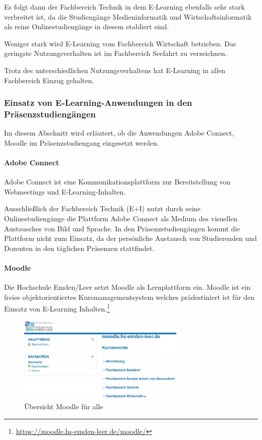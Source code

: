 Es folgt dann der Fachbereich Technik in dem E-Learning ebenfalls sehr stark verbreitet ist, da die Studiengänge Medieninformatik und Wirtschaftsinformatik als reine Onlinestudiengänge in diesem etabliert sind.

Weniger stark wird E-Learning vom Fachbereich Wirtschaft betrieben. Das geringste Nutzungsverhalten ist im Fachbereich Seefahrt zu verzeichnen.

Trotz des unterschiedlichen Nutzungsverhaltens hat E-Learning in allen Fachbereich Einzug gehalten.

\subsubsection[Einsatz von E-Learning-Anwendungen]{Einsatz von E-Learning-Anwendungen in den Präsenzstudiengängen}
Im diesem Abschnitt wird erläutert, ob die Anwendungen Adobe Connect, Moodle im Präsenzstudiengang eingesetzt werden.

\paragraph{Adobe Connect}
Adobe Connect ist eine Kommunikationsplattform zur Bereitstellung von Webmeetings und E-Learning-Inhalten.

Ausschließlich der Fachbereich Technik (E+I) nutzt durch seine Onlinestudiengänge die Plattform Adobe Connect als Medium des visuellen Austausches von Bild und Sprache. In den Präsenzstudiengängen kommt die Plattform nicht zum Einsatz, da der persönliche Austausch von Studierenden und Dozenten in den täglichen Präsenzen stattfindet.

\paragraph{Moodle}
Die Hochschule Emden/Leer setzt Moodle als Lernplattform ein. Moodle ist ein freies objektorientiertes Kursmanagementsystem welches prädestiniert ist für den Einsatz von E-Learning Inhalten.\footnote{\url{https://moodle.hs-emden-leer.de/moodle/}}

\begin{figure}[h!]
	\centering
	\includegraphics[width=8cm]{kapitel/gruppe2/bilder/moodle}
	\caption{Übersicht Moodle für alle}
	\label{fig_moodle}
\end{figure}

